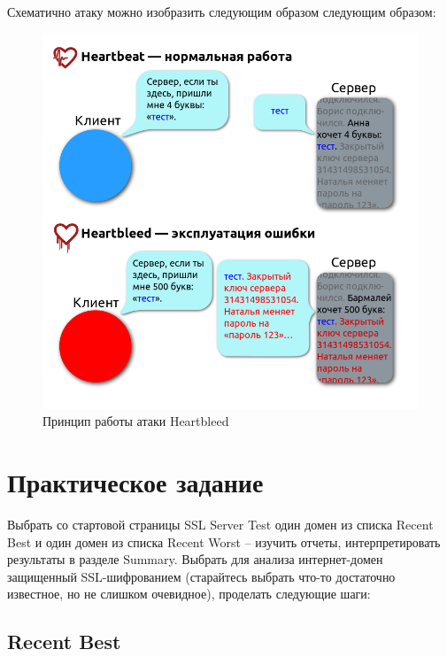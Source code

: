 \documentclass[a4paper]{article}
\begin{document}
Схематично атаку можно изобразить следующим образом следующим образом:

\begin{figure}[H]
	\begin{center}
		\includegraphics[scale=0.4]{pics/heartbleed.png}
		\caption{Принцип работы атаки Heartbleed} 
		\label{pic:pic_name}
	\end{center}
\end{figure}

\newpage

\section{Практическое задание}

Выбрать со стартовой страницы SSL Server Test один домен из списка Recent Best и один домен из списка Recent Worst – изучить отчеты, интерпретировать результаты в разделе Summary. Выбрать для анализа интернет-домен защищенный SSL-шифрованием (старайтесь выбрать что-то достаточно известное, но не слишком очевидное), проделать следующие шаги:

\subsection{Recent Best}
\end{document}
